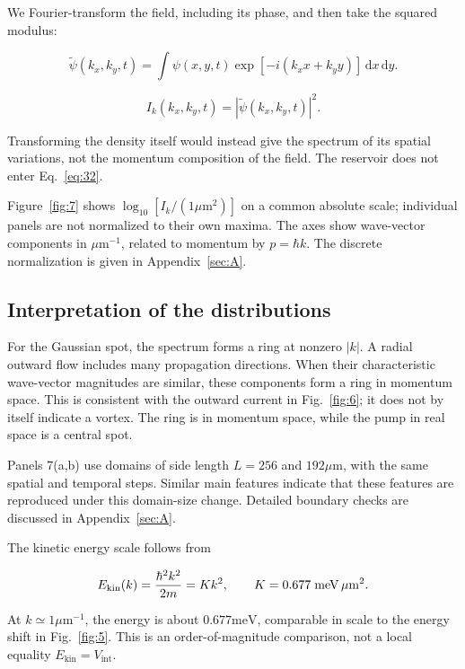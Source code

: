 \documentclass[12pt,a4paper]{article}
\begin{document}
We Fourier-transform the field, including its phase, and then take the squared modulus:

\begin{equation}\label{eq:32}
\widetilde\psi(k_x,k_y,t)=\int\psi(x,y,t)\exp[-i(k_xx+k_yy)]\,\mathrm dx\,\mathrm dy.\end{equation}

\begin{equation}\label{eq:33}
I_k(k_x,k_y,t)=|\widetilde\psi(k_x,k_y,t)|^2.\end{equation}

Transforming the density itself would instead give the spectrum of its spatial variations, not the momentum composition of the field. The reservoir does not enter Eq.~\eqref{eq:32}.

Figure~\ref{fig:7} shows $\log_{10}[I_{k}/(1 \mu\mathrm m^{2})]$ on a common absolute scale; individual panels are not normalized to their own maxima. The axes show wave-vector components in $\mu\mathrm m^{-1}$, related to momentum by $p=\hbar k$. The discrete normalization is given in Appendix~\ref{sec:A}.

\subsection{Interpretation of the distributions}\label{sec:7.2}

For the Gaussian spot, the spectrum forms a ring at nonzero $|k|$. A radial outward flow includes many propagation directions. When their characteristic wave-vector magnitudes are similar, these components form a ring in momentum space. This is consistent with the outward current in Fig.~\ref{fig:6}; it does not by itself indicate a vortex. The ring is in momentum space, while the pump in real space is a central spot.

Panels 7(a,b) use domains of side length $L=256$ and $192 \mu\mathrm m$, with the same spatial and temporal steps. Similar main features indicate that these features are reproduced under this domain-size change. Detailed boundary checks are discussed in Appendix~\ref{sec:A}.

The kinetic energy scale follows from

\begin{equation}\label{eq:34}
E_{\rm kin}(k)=\frac{\hbar^2k^2}{2m}=Kk^2,\qquad K=0.677\;\mathrm{meV}\,\mu\mathrm m^2.\end{equation}

At $k\simeq1 \mu\mathrm m^{-1}$, the energy is about $0.677 \mathrm{meV}$, comparable in scale to the energy shift in Fig.~\ref{fig:5}. This is an order-of-magnitude comparison, not a local equality $E_{\mathrm{kin}}=V_{\mathrm{int}}$.
\end{document}
